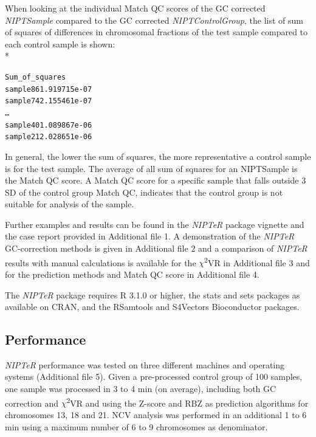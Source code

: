 When looking at the individual Match QC scores of the GC corrected \textsl{NIPTSample} compared to the GC corrected \textsl{NIPTControlGroup}, the list of sum of squares of differences in chromosomal fractions of the test sample compared to each control sample is shown: \\*  \vspace{-\baselineskip}


\begin{alltt}
	\footnotesize 
\noindent \hspace{15mm} Sum\_of\_squares \\
sample86 \baselineskip=4pt\hspace{1mm} 1.919715e-07 \\
sample74 \baselineskip=4pt\hspace{1mm} 2.155461e-07 \\
… \\
sample40 \baselineskip=4pt\hspace{1mm} 1.089867e-06 \\
sample21 \baselineskip=4pt\hspace{1mm} 2.028651e-06 \\
\end{alltt}

\noindent In general, the lower the sum of squares, the more representative a control sample is for the test sample. 
The average of all sum of squares for an NIPTSample is the Match QC score. 
A Match QC score for a specific sample that falls outside 3 SD of the control group Match QC, indicates that the control group is not suitable for analysis of the sample.

Further examples and results can be found in the \textsl{NIPTeR} package vignette \cite{Johansson_2016a} and the case report provided in Additional file 1. 
A demonstration of the \textsl{NIPTeR} GC-correction methods is given in Additional file 2 and a comparison of \textsl{NIPTeR} results with manual calculations is available for the $\chi$\textsuperscript{2}VR in Additional file 3 and for the prediction methods and Match QC score in Additional file 4.

The \textsl{NIPTeR} package requires R 3.1.0 or higher, the stats and sets packages as available on CRAN, and the RSamtools and S4Vectors Bioconductor packages.

\subsection{Performance}
\textsl{NIPTeR} performance was tested on three different machines and operating systems (Additional file 5). 
Given a pre-processed control group of 100 samples, one sample was processed in 3 to 4 min (on average), including both GC correction and $\chi$\textsuperscript{2}VR and using the Z-score and RBZ as prediction algorithms for chromosomes 13, 18 and 21. 
NCV analysis was performed in an additional 1 to 6 min using a maximum number of 6 to 9 chromosomes as denominator.

